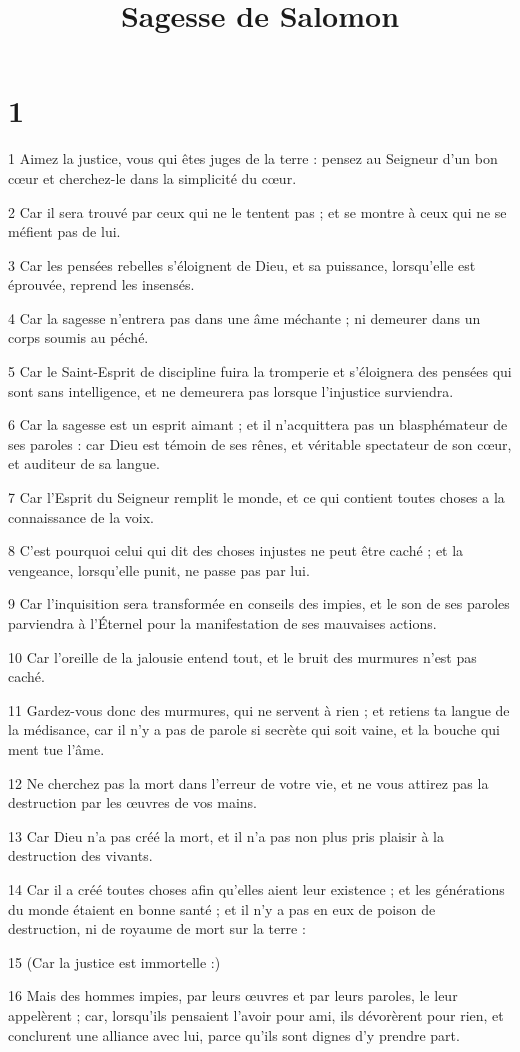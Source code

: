 

\title{Sagesse de Salomon}


\chapter{1}

\par 1 Aimez la justice, vous qui êtes juges de la terre : pensez au Seigneur d'un bon cœur et cherchez-le dans la simplicité du cœur.
\par 2 Car il sera trouvé par ceux qui ne le tentent pas ; et se montre à ceux qui ne se méfient pas de lui.
\par 3 Car les pensées rebelles s'éloignent de Dieu, et sa puissance, lorsqu'elle est éprouvée, reprend les insensés.
\par 4 Car la sagesse n'entrera pas dans une âme méchante ; ni demeurer dans un corps soumis au péché.
\par 5 Car le Saint-Esprit de discipline fuira la tromperie et s'éloignera des pensées qui sont sans intelligence, et ne demeurera pas lorsque l'injustice surviendra.
\par 6 Car la sagesse est un esprit aimant ; et il n'acquittera pas un blasphémateur de ses paroles : car Dieu est témoin de ses rênes, et véritable spectateur de son cœur, et auditeur de sa langue.
\par 7 Car l'Esprit du Seigneur remplit le monde, et ce qui contient toutes choses a la connaissance de la voix.
\par 8 C'est pourquoi celui qui dit des choses injustes ne peut être caché ; et la vengeance, lorsqu'elle punit, ne passe pas par lui.
\par 9 Car l'inquisition sera transformée en conseils des impies, et le son de ses paroles parviendra à l'Éternel pour la manifestation de ses mauvaises actions.
\par 10 Car l'oreille de la jalousie entend tout, et le bruit des murmures n'est pas caché.
\par 11 Gardez-vous donc des murmures, qui ne servent à rien ; et retiens ta langue de la médisance, car il n'y a pas de parole si secrète qui soit vaine, et la bouche qui ment tue l'âme.
\par 12 Ne cherchez pas la mort dans l'erreur de votre vie, et ne vous attirez pas la destruction par les œuvres de vos mains.
\par 13 Car Dieu n'a pas créé la mort, et il n'a pas non plus pris plaisir à la destruction des vivants.
\par 14 Car il a créé toutes choses afin qu'elles aient leur existence ; et les générations du monde étaient en bonne santé ; et il n'y a pas en eux de poison de destruction, ni de royaume de mort sur la terre :
\par 15 (Car la justice est immortelle :)
\par 16 Mais des hommes impies, par leurs œuvres et par leurs paroles, le leur appelèrent ; car, lorsqu'ils pensaient l'avoir pour ami, ils dévorèrent pour rien, et conclurent une alliance avec lui, parce qu'ils sont dignes d'y prendre part.

